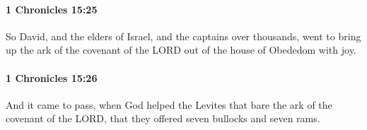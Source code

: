 		\paragraph{1 Chronicles 15:25} %
			\label{1CHRONICLES-15-25}

			So David, and the elders of Israel, and the captains over thousands, went to bring up the ark of the covenant of the LORD out of the house of Obededom with joy.


		\paragraph{1 Chronicles 15:26} %
			\label{1CHRONICLES-15-26}

			And it came to pass, when God helped the Levites that bare the ark of the covenant of the LORD, that they offered seven bullocks and seven rams.


